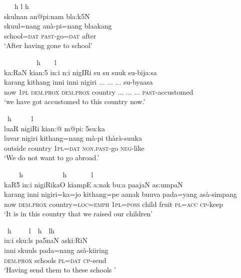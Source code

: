 \ea \label{K051222nar04.19a}
\gllll ~~~h \hspace{.9cm}l  \hspace{1cm}h \\
skulnan an@pi:nam bla:k5N  \\
skuul=nang anà-pi=nang blaakang  \\
school=\textsc{dat} \textsc{past}-go=\textsc{dat} after  \\
`After having gone to school'
\z

\ea \label{K051222nar04.19b}
\gllll ~ ~              ~   ~     ~      ~h                ~ ~    \hspace{1.4cm}l\\
 ka:RaN ki\dentt an:5 in:i n:i nigIRi su\textrhoticity{} su suuk su-bija:sa\\
 karang kithang inni inni  nigiri ... ... ...	  su-byaasa\\
now 	\textsc{1pl} 	\textsc{dem.prox}  \textsc{dem.prox} country ... ... ... \textsc{past}-accustomed\\
`we have got accustomed to this country now.'
\z


\ea \label{K051222nar04.20}
\gllll ~h  ~        ~          ~    \hspace{1.4cm}l\\
 lu\V aR nigiRi ki\dentt an:@ m@pi: \dentt@R5su:ka\\
 luvar nigiri kithang=nang mà-pi thàrà-suuka\\
 outside country \textsc{1pl}=\textsc{dat} \textsc{non.past}-go \textsc{neg}-like\\
`We do  not want to go abroad.'
\z


\ea \label{K051222nar04.21}
\gllll ~ ~   ~h            ~              ~    ~      ~          ~~~~h~~~~~~~l\\
 kaR\~5 in:i nigiRika\J O ki\dentt ampE a:nak bu:\V a pa\dz ajaN as:umpaN \\
 karang inni nigiri=ka=jo kithang=pe aanak buuva\footnotemark{} pada=yang asà-simpang \\
 now \textsc{dem.prox} country=\textsc{loc}=\textsc{emph} \textsc{1pl}=\textsc{poss} child fruit  \textsc{pl}=\textsc{acc} \textsc{cp}-keep\\
`It is in this country that we raised our children'
\z




\ea \label{K051222nar04.22}
\gllll ~h ~  ~         ~l~~h~~lh\\
in:i sku:ls pa\dz 5naN aski:RiN\\
 inni skuuls pada=nang  asà-kiiring\\
 \textsc{dem.prox} schools \textsc{pl}=\textsc{dat}  \textsc{cp}-send\\
`Having send them to these schools '
\z


